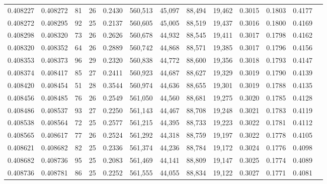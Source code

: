 \begin{tabular}{rrrrrrrrrrrrr}
0.408227 & 0.408272 &    81 &  26 &                                     0.2430 & 560,513 &  45,097 &  88,494 &  19,462 & 0.3015 & 0.1803 & 0.4177 \\
0.408272 & 0.408295 &    92 &  25 &                                     0.2137 & 560,605 &  45,005 &  88,519 &  19,437 & 0.3016 & 0.1800 & 0.4169 \\
0.408298 & 0.408320 &    73 &  26 &                                     0.2626 & 560,678 &  44,932 &  88,545 &  19,411 & 0.3017 & 0.1798 & 0.4162 \\
0.408320 & 0.408352 &    64 &  26 &                                     0.2889 & 560,742 &  44,868 &  88,571 &  19,385 & 0.3017 & 0.1796 & 0.4156 \\
0.408353 & 0.408373 &    96 &  29 &                                     0.2320 & 560,838 &  44,772 &  88,600 &  19,356 & 0.3018 & 0.1793 & 0.4147 \\
0.408374 & 0.408417 &    85 &  27 &                                     0.2411 & 560,923 &  44,687 &  88,627 &  19,329 & 0.3019 & 0.1790 & 0.4139 \\
0.408420 & 0.408454 &    51 &  28 &                                     0.3544 & 560,974 &  44,636 &  88,655 &  19,301 & 0.3019 & 0.1788 & 0.4135 \\
0.408456 & 0.408485 &    76 &  26 &                                     0.2549 & 561,050 &  44,560 &  88,681 &  19,275 & 0.3020 & 0.1785 & 0.4128 \\
0.408486 & 0.408537 &    93 &  27 &                                     0.2250 & 561,143 &  44,467 &  88,708 &  19,248 & 0.3021 & 0.1783 & 0.4119 \\
0.408538 & 0.408564 &    72 &  25 &                                     0.2577 & 561,215 &  44,395 &  88,733 &  19,223 & 0.3022 & 0.1781 & 0.4112 \\
0.408565 & 0.408617 &    77 &  26 &                                     0.2524 & 561,292 &  44,318 &  88,759 &  19,197 & 0.3022 & 0.1778 & 0.4105 \\
0.408621 & 0.408682 &    82 &  25 &                                     0.2336 & 561,374 &  44,236 &  88,784 &  19,172 & 0.3024 & 0.1776 & 0.4098 \\
0.408682 & 0.408736 &    95 &  25 &                                     0.2083 & 561,469 &  44,141 &  88,809 &  19,147 & 0.3025 & 0.1774 & 0.4089 \\
0.408736 & 0.408781 &    86 &  25 &                                     0.2252 & 561,555 &  44,055 &  88,834 &  19,122 & 0.3027 & 0.1771 & 0.4081 \\

\end{tabular}
